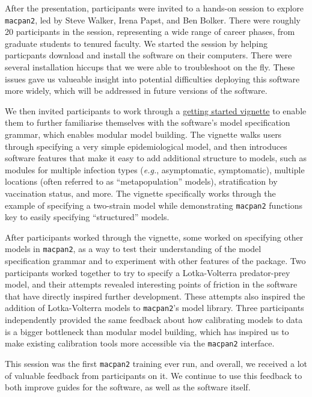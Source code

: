\documentclass{article}
\newcommand{\macpan}{\texttt{macpan2}\xspace}
\newcommand{\eg}{\textit{e.g.},\xspace}
\begin{document}
  After the presentation, participants were invited to a hands-on session to explore \macpan, led by Steve Walker, Irena Papst, and Ben Bolker. There were roughly 20 participants in the session, representing a wide range of career phases, from graduate students to tenured faculty. We started the session by helping particpants download and install the software on their computers. There were several installation hiccups that we were able to troubleshoot on the fly. These issues gave us valueable insight into potential difficulties deploying this software more widely, which will be addressed in future versions of the software.

  We then invited participants to work through a \href{https://github.com/canmod/macpan2/blob/refactorcpp/vignettes/quickstart.Rmd}{getting started vignette} to enable them to further familiarise themselves with the software's model specification grammar, which enables modular model building. The vignette walks users through specifying a very simple epidemiological model, and then introduces software features that make it easy to add additional structure to models, such as modules for multiple infection types (\eg asymptomatic, symptomatic), multiple locations (often referred to as ``metapopulation'' models), stratification by vaccination status, and more. The vignette specifically works through the example of specifying a two-strain model while demonstrating \macpan functions key to easily specifying ``structured'' models.

  After participants worked through the vignette, some worked on specifying other models in \macpan, as a way to test their understanding of the model specification grammar and to experiment with other features of the package. Two participants worked together to try to specify a Lotka-Volterra predator-prey model, and their attempts revealed interesting points of friction in the software that have directly inspired further development. These attempts also inspired the addition of Lotka-Volterra models to \macpan's model library. Three participants independently provided the same feedback about how calibrating models to data is a bigger bottleneck than modular model building, which has inspired us to make existing calibration tools more accessible via the \macpan interface.

  This session was the first \macpan training ever run, and overall, we received a lot of valuable feedback from participants on it. We continue to use this feedback to both improve guides for the software, as well as the software itself.
\end{document}
